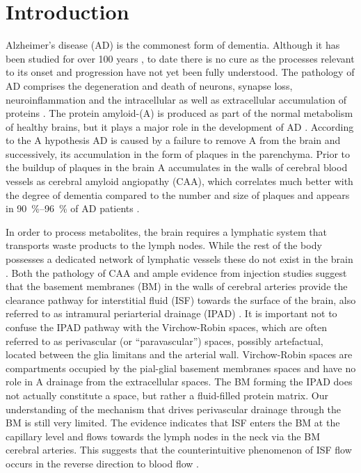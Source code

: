 \documentclass{frontiersFPHY} %
\newcommand{\Ab}{A\textbeta\xspace}
\begin{document}
\section{Introduction}

Alzheimer's disease (AD) is the commonest form of dementia. Although it has been studied for over 100 years \cite{Selkoe2001}, to date there is no cure as the processes relevant to its onset and progression have not yet been fully understood. The pathology of AD comprises the degeneration and death of neurons, synapse loss, neuroinflammation and the intracellular as well as extracellular accumulation of proteins \cite{Koffie2011}. The protein amyloid-\textbeta\xspace (\Ab) is produced as part of the normal metabolism of healthy brains, but it plays a major role in the development of AD \cite{Haass1992}. According to the \Ab hypothesis AD is caused by a failure to remove \Ab from the brain and successively, its accumulation in the form of plaques in the parenchyma. Prior to the buildup of plaques in the brain \Ab accumulates in the walls of cerebral blood vessels as cerebral amyloid angiopathy (CAA), which correlates much better with the degree of dementia compared to the number and size of plaques and appears in \SIrange{90}{96}{\percent} of AD patients \cite{Weller2006, Weller2009}.

In order to process metabolites, the brain requires a lymphatic system that transports waste products to the lymph nodes. While the rest of the body possesses a dedicated network of lymphatic vessels these do not exist in the brain \cite{Weller2010}. Both the pathology of CAA and ample evidence from injection studies suggest that the basement membranes (BM) in the walls of cerebral arteries provide the clearance pathway for interstitial fluid (ISF) towards the surface of the brain, also referred to as intramural periarterial drainage (IPAD) \cite{Weller2010,Carare2008,Hawkes2011,Morris2014}. It is important not to confuse the IPAD pathway with the Virchow-Robin spaces, which are often referred to as perivascular (or ``paravascular'') spaces, possibly artefactual, located between the glia limitans and the arterial wall. Virchow-Robin spaces are compartments occupied by the pial-glial basement membranes spaces and have no role in \Ab drainage from the extracellular spaces. The BM forming the IPAD does not actually constitute a space, but rather a fluid-filled protein matrix. Our understanding of the mechanism that drives perivascular drainage through the BM is still very limited. The evidence indicates that ISF enters the BM at the capillary level and flows towards the lymph nodes in the neck via the BM cerebral arteries. This suggests that the counterintuitive phenomenon of ISF flow occurs in the reverse direction to blood flow \cite{Carare2008}.
\end{document}
